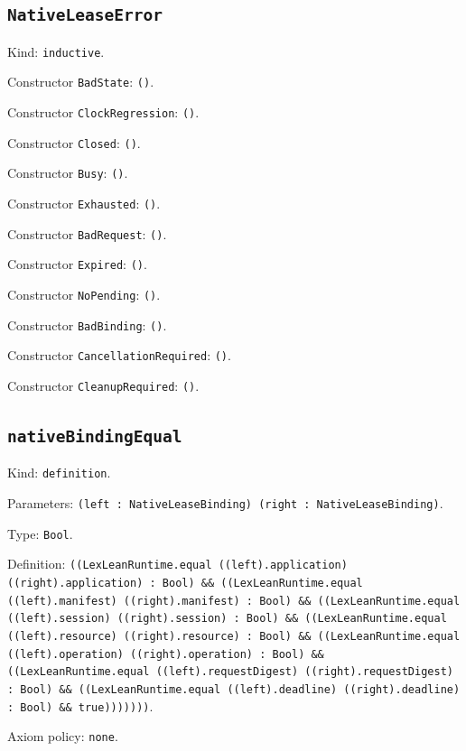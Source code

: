 \documentclass[11pt]{article}
\begin{document}
\subsection*{\texttt{NativeLeaseError}}
\noindent Kind: \texttt{inductive}.\par
\noindent Constructor \texttt{BadState}: \texttt{()}.\par
\noindent Constructor \texttt{ClockRegression}: \texttt{()}.\par
\noindent Constructor \texttt{Closed}: \texttt{()}.\par
\noindent Constructor \texttt{Busy}: \texttt{()}.\par
\noindent Constructor \texttt{Exhausted}: \texttt{()}.\par
\noindent Constructor \texttt{BadRequest}: \texttt{()}.\par
\noindent Constructor \texttt{Expired}: \texttt{()}.\par
\noindent Constructor \texttt{NoPending}: \texttt{()}.\par
\noindent Constructor \texttt{BadBinding}: \texttt{()}.\par
\noindent Constructor \texttt{CancellationRequired}: \texttt{()}.\par
\noindent Constructor \texttt{CleanupRequired}: \texttt{()}.\par
\subsection*{\texttt{nativeBindingEqual}}
\noindent Kind: \texttt{definition}.\par
\noindent Parameters: \texttt{(left : NativeLeaseBinding) (right : NativeLeaseBinding)}.\par
\noindent Type: \texttt{Bool}.\par
\noindent Definition: \texttt{((LexLeanRuntime.equal ((left).application) ((right).application) : Bool) \&\& ((LexLeanRuntime.equal ((left).manifest) ((right).manifest) : Bool) \&\& ((LexLeanRuntime.equal ((left).session) ((right).session) : Bool) \&\& ((LexLeanRuntime.equal ((left).resource) ((right).resource) : Bool) \&\& ((LexLeanRuntime.equal ((left).operation) ((right).operation) : Bool) \&\& ((LexLeanRuntime.equal ((left).requestDigest) ((right).requestDigest) : Bool) \&\& ((LexLeanRuntime.equal ((left).deadline) ((right).deadline) : Bool) \&\& true)))))))}.\par
\noindent Axiom policy: \texttt{none}.\par
\end{document}
